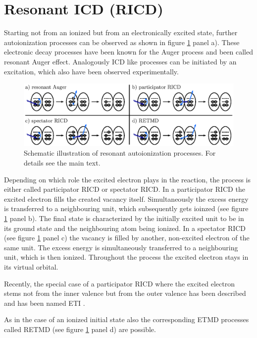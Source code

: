 \section{Resonant ICD (RICD)}
Starting not from an ionized but from an electronically excited state, further
autoionization processes can be observed
as shown in figure \ref{figure:ricd_processes} panel a).
These electronic decay processes have been known for
the Auger process and been called resonant Auger effect. Analogously ICD like
processes can be initiated by an excitation, which also have been observed
experimentally. \cite{Barth05,Gokhberg06,Kopelke09}

\begin{figure}[h]
 \centering
 \includegraphics{pics/ricd-pspic.eps}
 \caption{Schematic illustration of resonant autoionization processes.
          For details see the main text.}
 \label{figure:ricd_processes}
\end{figure}

Depending on which role the excited
electron plays in the reaction, the process is either called participator \ac{RICD}
or spectator \ac{RICD}.
In a participator \ac{RICD} the excited electron fills the created vacancy itself.
Simultaneously the excess energy is transferred to a neighbouring unit, which
subsequently gets ioinzed (see figure \ref{figure:ricd_processes} panel b).
The final state is characterized
by the initially excited unit to be in its ground state and the neighbouring atom
being ionized.
In a spectator \ac{RICD} (see figure \ref{figure:ricd_processes} panel c)
the vacancy is filled by another, non-excited electron
of the same unit. The excess energy is simultaneously transferred to a neighbouring
unit, which is then ionized. Throughout the process the excited electron stays
in its virtual orbital.

Recently, the special case of a participator \ac{RICD} where the excited
electron stems not from the inner valence but from the outer valence
has been described and has been named \ac{ETI} \cite{Kopelke11}.

As in the case of an ionized initial state also the corresponding ETMD processes
called RETMD (see figure \ref{figure:ricd_processes} panel d) are possible.



